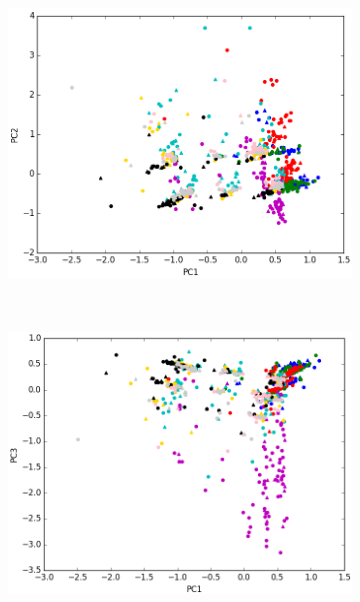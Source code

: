 \begin{figure}[ht!]	
	\begin{subfigure}[b]{0.49\textwidth}
		\includegraphics[width=\linewidth]{img/oja/3dim-pc1-pc2.png}
	\end{subfigure}%
	~
	\begin{subfigure}[b]{0.5\textwidth}
		\includegraphics[width=\linewidth]{img/oja/3dim-pc1-pc3.png}
	\end{subfigure}%
	\\
	\centering
	\begin{subfigure}[b]{0.5\textwidth}

\end{subfigure}
\end{figure}

